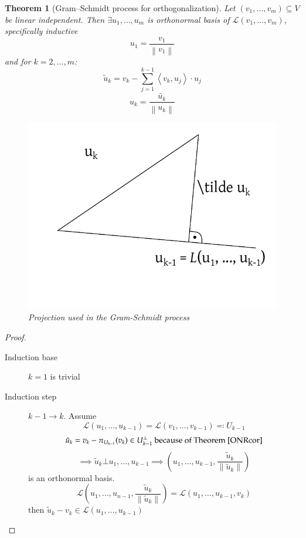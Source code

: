 \documentclass{article}
\newtheorem{theorem}{Theorem}  \numberwithin{theorem}{section}
\newcommand{\ip}[2]{\left\langle#1,#2\right\rangle} %
\newcommand{\norm}[1]{\left\|#1\right\|}
\begin{document}
\begin{theorem}[Gram–Schmidt process for orthogonalization] %
  Let $(v_1, \ldots, v_m) \subseteq V$ be linear independent.
  Then $\exists u_1, \ldots, u_m$ is orthonormal basis of $\mathcal L(v_1, \ldots, v_m)$, specifically inductive
  \[ u_1 = \frac{v_1}{\norm{v_1}} \]
  and for $k = 2, \ldots, m$:
  \[ \tilde u_k = v_k - \sum_{j=1}^{k-1} \ip{v_k}{u_j} \cdot u_j \]
  \[ u_k = \frac{\tilde{u_k}}{\norm{u_k}} \]
  \begin{figure}[t]
    \begin{center}
      \includegraphics{img/12_GS_projection.pdf}
      \caption{Projection used in the Gram-Schmidt process}
      \label{GSproj}
    \end{center}
  \end{figure}
\end{theorem}

\begin{proof}
  \begin{description}
    \item[Induction base] $k=1$ is trivial
    \item[Induction step] $k-1 \to k$. Assume
      \[ \mathcal L(u_1, \ldots, u_{k-1}) = \mathcal L(v_1, \ldots, v_{k-1}) \eqqcolon U_{k-1} \]
      \[ \tilde u_k = v_k - \pi_{U_{k-1}}(v_k) \in U_{k-1}^\bot \text{ because of Theorem~\ref{ONRcor}} \]
      \[ \implies \tilde u_k \bot u_1, \ldots, u_{k-1} \implies (u_1, \ldots, u_{k-1}, \frac{\tilde u_k}{\norm{\tilde u_k}}) \]
      is an orthonormal basis.
      \[
        \mathcal L(u_1, \ldots, u_{n-1}, \frac{\tilde u_k}{\norm{\tilde u_k}})
          = \mathcal L(u_1, \ldots, u_{k-1}, v_k)
      \]
      then $\tilde u_k - v_k \in \mathcal L(u_1, \ldots, u_{k-1})$
  \end{description}
\end{proof}
\end{document}
